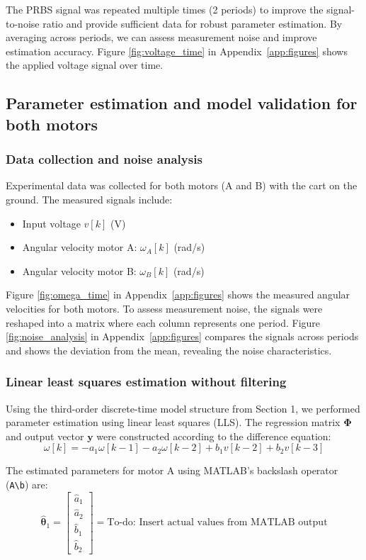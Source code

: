 \documentclass{article}
\begin{document}
	The PRBS signal was repeated multiple times (2 periods) to improve the signal-to-noise ratio and provide sufficient data for robust parameter estimation. By averaging across periods, we can assess measurement noise and improve estimation accuracy. Figure \ref{fig:voltage_time} in Appendix~\ref{app:figures} shows the applied voltage signal over time.
	
	\subsection{Parameter estimation and model validation for both motors}
	
	\subsubsection{Data collection and noise analysis}
	
	Experimental data was collected for both motors (A and B) with the cart on the ground. The measured signals include:
	\begin{itemize}
		\item Input voltage $v[k]$ (V)
		\item Angular velocity motor A: $\omega_A[k]$ (rad/s)
		\item Angular velocity motor B: $\omega_B[k]$ (rad/s)
	\end{itemize}
	
	Figure \ref{fig:omega_time} in Appendix~\ref{app:figures} shows the measured angular velocities for both motors. To assess measurement noise, the signals were reshaped into a matrix where each column represents one period. Figure \ref{fig:noise_analysis} in Appendix~\ref{app:figures} compares the signals across periods and shows the deviation from the mean, revealing the noise characteristics.
	
	\subsubsection{Linear least squares estimation without filtering}
	
	Using the third-order discrete-time model structure from Section 1, we performed parameter estimation using linear least squares (LLS). The regression matrix $\boldsymbol{\Phi}$ and output vector $\boldsymbol{y}$ were constructed according to the difference equation:
	\[
	\omega[k] = -a_1\omega[k-1] - a_2\omega[k-2] + b_1 v[k-2] + b_2 v[k-3]
	\]
	
	The estimated parameters for motor A using MATLAB's backslash operator (\texttt{A\textbackslash b}) are:
	\begin{equation}
		\hat{\boldsymbol{\theta}}_1 = \begin{bmatrix} \hat{a}_1 \\ \hat{a}_2 \\ \hat{b}_1 \\ \hat{b}_2 \end{bmatrix} = \text{To-do: Insert actual values from MATLAB output}
	\end{equation}
	
\end{document}
